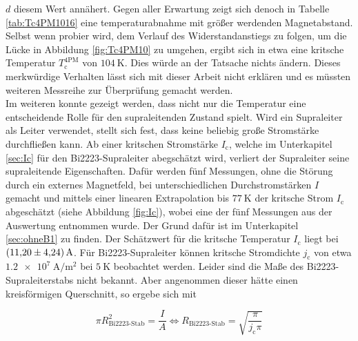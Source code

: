 $d$ diesem Wert annähert. Gegen aller Erwartung zeigt sich denoch in Tabelle
\ref{tab:Tc4PM1016} eine temperaturabnahme mit größer werdenden Magnetabstand.
Selbst wenn probier wird, dem Verlauf des Widerstandanstiegs zu folgen, um die
Lücke in Abbildung \ref{fig:Tc4PM10} zu umgehen, ergibt sich in etwa eine kritsche
Temperatur $T^{\text{4PM}}_{\text{c}}$ von $\SI{104}{\kelvin}$. Dies würde an der
Tatsache nichts ändern. Dieses merkwürdige Verhalten lässt sich mit dieser Arbeit
nicht erklären und es müssten weiteren Messreihe zur Überprüfung gemacht werden. \\
Im weiteren konnte gezeigt werden, dass nicht nur die Temperatur eine entscheidende
Rolle für den supraleitenden Zustand spielt. Wird ein Supraleiter als Leiter
verwendet, stellt sich fest, dass keine beliebig große Stromstärke durchfließen
kann. Ab einer kritschen Stromstärke $I_{\text{c}}$, welche im Unterkapitel \ref{sec:Ic}
für den Bi2223-Supraleiter abegschätzt wird, verliert der Supraleiter seine
supraleitende Eigenschaften. Dafür werden fünf Messungen, ohne die Störung durch ein
externes Magnetfeld, bei unterschiedlichen Durchstromstärken $I$ gemacht und mittels
einer linearen Extrapolation bis $\SI{77}{\kelvin}$ der kritsche Strom $I_{\text{c}}$
abgeschätzt (siehe Abbildung \ref{fig:Ic}), wobei eine der fünf Messungen aus der
Auswertung entnommen wurde. Der Grund dafür ist im Unterkapitel \ref{sec:ohneB1}
zu finden. Der Schätzwert für die kritsche Temperatur $I_{\text{c}}$ liegt bei
$\SI{11.2\pm4,24}{\ampere}$. Für Bi2223-Supraleiter können kritsche Stromdichte $j_{\text{c}}$
von etwa $\SI{1.2e7}{\ampere\per\metre\squared}$ bei $\SI{5}{\kelvin}$
\cite[S. 345]{2223} beobachtet werden. Leider sind die Maße des Bi2223-Supraleiterstabs
nicht bekannt. Aber angenommen dieser hätte einen kreisförmigen Querschnitt, so
ergebe sich mit

\begin{equation*}
  \pi R_{\text{Bi2223-Stab}}^2 = \frac{I}{A}
  \iff
  R_{\text{Bi2223-Stab}} = \sqrt{\frac{\pi}{j_{\text{c}}\pi}}
\end{equation*}

